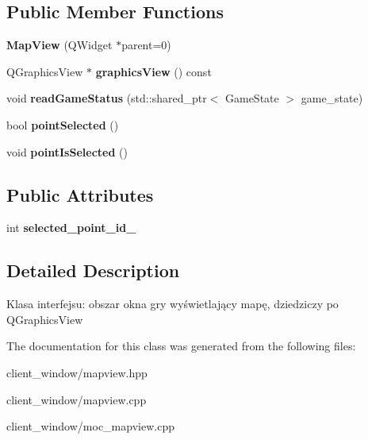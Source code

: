 \subsection*{Public Member Functions}
\begin{DoxyCompactItemize}
\item 
{\bfseries Map\+View} (Q\+Widget $\ast$parent=0)\hypertarget{classMapView_a4dbedd735235252920e1ce4265768d31}{}\label{classMapView_a4dbedd735235252920e1ce4265768d31}

\item 
Q\+Graphics\+View $\ast$ {\bfseries graphics\+View} () const \hypertarget{classMapView_aad89785cc6217fb112498e893f18d34e}{}\label{classMapView_aad89785cc6217fb112498e893f18d34e}

\item 
void {\bfseries read\+Game\+Status} (std\+::shared\+\_\+ptr$<$ Game\+State $>$ game\+\_\+state)\hypertarget{classMapView_a71f8f8e460fbb2593bf931402f64b315}{}\label{classMapView_a71f8f8e460fbb2593bf931402f64b315}

\item 
bool {\bfseries point\+Selected} ()\hypertarget{classMapView_a08a0bc12af9ed3be5634f310a547436c}{}\label{classMapView_a08a0bc12af9ed3be5634f310a547436c}

\item 
void {\bfseries point\+Is\+Selected} ()\hypertarget{classMapView_a31c953eb544594fca9beb7c713d1fff6}{}\label{classMapView_a31c953eb544594fca9beb7c713d1fff6}

\end{DoxyCompactItemize}
\subsection*{Public Attributes}
\begin{DoxyCompactItemize}
\item 
int {\bfseries selected\+\_\+point\+\_\+id\+\_\+}\hypertarget{classMapView_ab981b6988372e64566774db5cc70df04}{}\label{classMapView_ab981b6988372e64566774db5cc70df04}

\end{DoxyCompactItemize}


\subsection{Detailed Description}
Klasa interfejsu\+: obszar okna gry wyświetlający mapę, dziedziczy po Q\+Graphics\+View 

The documentation for this class was generated from the following files\+:\begin{DoxyCompactItemize}
\item 
client\+\_\+window/mapview.\+hpp\item 
client\+\_\+window/mapview.\+cpp\item 
client\+\_\+window/moc\+\_\+mapview.\+cpp\end{DoxyCompactItemize}
